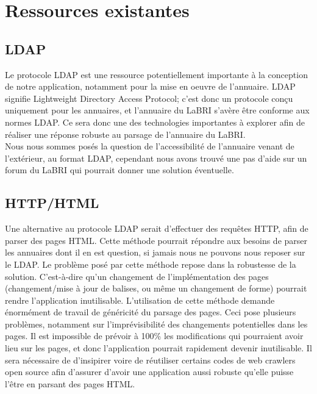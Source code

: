 \documentclass [pdftex,12pt] {report}
\begin{document}
\section{Ressources existantes}

\subsection{LDAP}
Le protocole LDAP est une ressource potentiellement importante à la conception de notre application, notamment pour la mise en oeuvre de l'annuaire. LDAP signifie Lightweight Directory Access Protocol; c'est donc un protocole conçu uniquement pour les annuaires, et l'annuaire du LaBRI s'avère être conforme aux normes LDAP.
Ce sera donc une des technologies importantes à explorer afin de réaliser une réponse robuste au parsage de l'annuaire du LaBRI.\\
Nous nous sommes posés la question de l'accessibilité de l'annuaire venant de l'extérieur, au format LDAP, cependant nous avons trouvé une pas d'aide sur un forum du LaBRI\cite{labriForum} qui pourrait donner une solution éventuelle.

\subsection{HTTP/HTML}
Une alternative au protocole LDAP serait d'effectuer des requêtes HTTP, afin de parser des pages HTML. Cette méthode pourrait répondre aux besoins de parser les annuaires dont il en est question, si jamais nous ne pouvons nous reposer sur le LDAP. Le problème posé par cette méthode repose dans la robustesse de la solution. C'est-à-dire qu'un changement de l'implémentation des pages (changement/mise à jour de balises, ou même un changement de forme) pourrait rendre l'application inutilisable. L'utilisation de cette méthode demande énormément de travail de généricité du parsage des pages.
Ceci pose plusieurs problèmes, notamment sur l'imprévisibilité des changements potentielles dans les pages. Il est impossible de prévoir à 100\% les modifications qui pourraient avoir lieu sur les pages, et donc l'application pourrait rapidement devenir inutilisable. Il sera nécessaire de d'insipirer voire de réutiliser certains codes de web crawlers open source afin d'assurer d'avoir une application aussi robuste qu'elle puisse l'être en parsant des pages HTML.
\end{document}
